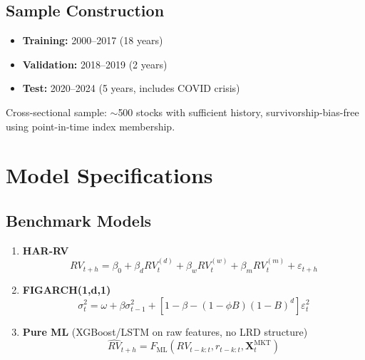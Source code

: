 \documentclass[11pt,a4paper]{article}
\theoremstyle{definition}
\begin{document}
\subsection{Sample Construction}

\begin{itemize}
    \item \textbf{Training:} 2000--2017 (18 years)
    \item \textbf{Validation:} 2018--2019 (2 years)
    \item \textbf{Test:} 2020--2024 (5 years, includes COVID crisis)
\end{itemize}

Cross-sectional sample: $\sim$500 stocks with sufficient history, survivorship-bias-free using point-in-time index membership.

\section{Model Specifications}

\subsection{Benchmark Models}

\begin{enumerate}[label=\textbf{B\arabic*:}]
    \item \textbf{HAR-RV} \citep{corsi2009simple}
    \begin{equation}
        RV_{t+h} = \beta_0 + \beta_d RV_t^{(d)} + \beta_w RV_t^{(w)} + \beta_m RV_t^{(m)} + \varepsilon_{t+h}
    \end{equation}
    
    \item \textbf{FIGARCH(1,d,1)}
    \begin{equation}
        \sigma_t^2 = \omega + \beta \sigma_{t-1}^2 + \left[1 - \beta - (1-\phi B)(1-B)^d\right]\varepsilon_t^2
    \end{equation}
    
    \item \textbf{Pure ML} (XGBoost/LSTM on raw features, no LRD structure)
    \begin{equation}
        \widehat{RV}_{t+h} = F_{\text{ML}}\left(RV_{t-k:t}, r_{t-k:t}, \mathbf{X}_t^{\text{MKT}}\right)
    \end{equation}
\end{enumerate}
\end{document}
